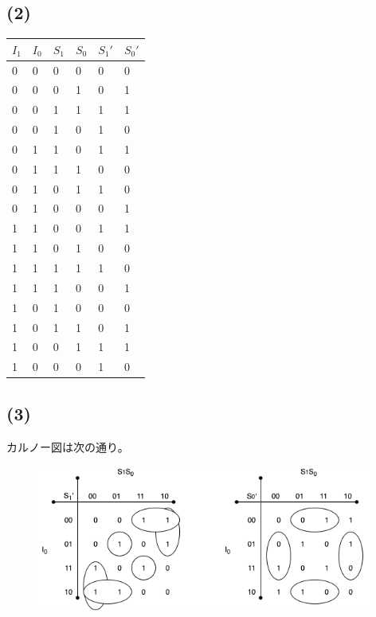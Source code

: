 \documentclass[a4paper,12pt,xelatex,ja=standard]{bxjsarticle}
\begin{document}
\subsection*{(2)}
\begin{table}[H]
  \centering
  \begin{tabular}{|l|l|l|l||l|l|}
  \hline
  $I_1$ & $I_0$ & $S_1$ & $S_0$ & $S_1'$ & $S_0'$ \\ \hline \hline
  0     & 0     & 0     & 0     & 0      & 0      \\ \hline
  0     & 0     & 0     & 1     & 0      & 1      \\ \hline
  0     & 0     & 1     & 1     & 1      & 1      \\ \hline
  0     & 0     & 1     & 0     & 1      & 0      \\ \hline
  0     & 1     & 1     & 0     & 1      & 1      \\ \hline
  0     & 1     & 1     & 1     & 0      & 0      \\ \hline
  0     & 1     & 0     & 1     & 1      & 0      \\ \hline
  0     & 1     & 0     & 0     & 0      & 1      \\ \hline
  1     & 1     & 0     & 0     & 1      & 1      \\ \hline
  1     & 1     & 0     & 1     & 0      & 0      \\ \hline
  1     & 1     & 1     & 1     & 1      & 0      \\ \hline
  1     & 1     & 1     & 0     & 0      & 1      \\ \hline
  1     & 0     & 1     & 0     & 0      & 0      \\ \hline
  1     & 0     & 1     & 1     & 0      & 1      \\ \hline
  1     & 0     & 0     & 1     & 1      & 1      \\ \hline
  1     & 0     & 0     & 0     & 1      & 0      \\ \hline
  \end{tabular}
\end{table}

\subsection*{(3)}
カルノー図は次の通り。

\begin{figure}[H]
  \centering
  \includegraphics[width=11cm]{images/2018_karnaugh.png}
\end{figure}
\end{document}

